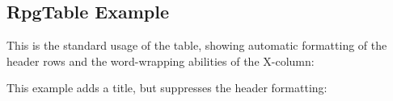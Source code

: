 		\subsection{RpgTable Example}

		This is the standard usage of the table, showing automatic formatting of the header rows and the word-wrapping abilities of the X-column:


		This example adds a title, but suppresses the header formatting:

		

